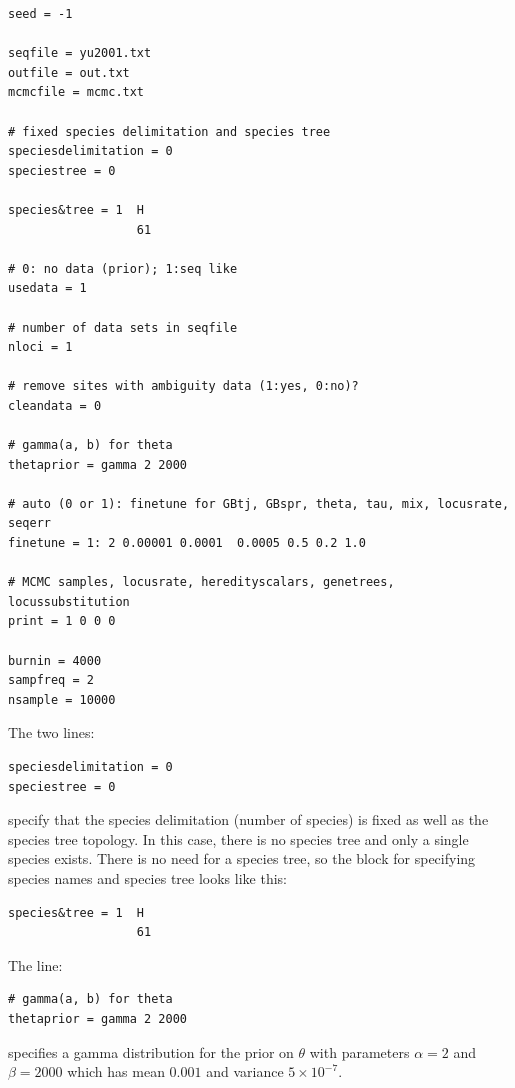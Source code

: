 \documentclass[a4paper]{book}
\numberwithin{equation}{section} \renewcommand{\baselinestretch}{0.55}
\begin{document}
\begin{verbatim}
seed = -1

seqfile = yu2001.txt
outfile = out.txt
mcmcfile = mcmc.txt

# fixed species delimitation and species tree
speciesdelimitation = 0 
speciestree = 0

species&tree = 1  H
                  61  

# 0: no data (prior); 1:seq like
usedata = 1

# number of data sets in seqfile
nloci = 1    

# remove sites with ambiguity data (1:yes, 0:no)?
cleandata = 0    

# gamma(a, b) for theta
thetaprior = gamma 2 2000

# auto (0 or 1): finetune for GBtj, GBspr, theta, tau, mix, locusrate, seqerr
finetune = 1: 2 0.00001 0.0001  0.0005 0.5 0.2 1.0  

# MCMC samples, locusrate, heredityscalars, genetrees, locussubstitution
print = 1 0 0 0  

burnin = 4000
sampfreq = 2
nsample = 10000
\end{verbatim}

\noindent
The two lines:
\begin{verbatim}
speciesdelimitation = 0 
speciestree = 0
\end{verbatim}
specify that the species delimitation (number of species) is fixed as
well as the species tree topology. In this case,
there is no species tree and only a single species exists.  There is
no need for a species tree, so the block for specifying species names
and species tree looks like this:
\begin{verbatim}
species&tree = 1  H
                  61
\end{verbatim}
\noindent
The line:
\begin{verbatim}
# gamma(a, b) for theta
thetaprior = gamma 2 2000
\end{verbatim}
specifies a gamma distribution for the prior on $\theta$ with
parameters $\alpha = 2$ and $\beta = 2000$ which has mean $0.001$ and
variance $5 \times 10^{-7}$.
\end{document}
